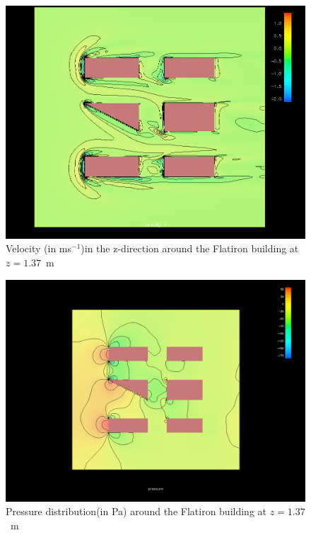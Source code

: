\begin{figure}[htp]
\centering
\includegraphics[width = \textwidth]{zvelocity.png}
\caption{Velocity (in ms$^{-1}$)in the z-direction around the Flatiron building at $z=1.37$~m}
\label{fig:zvelocity}
\end{figure}
\begin{figure}[htp]
\centering
\includegraphics[width = \textwidth]{zpressure.png}
\caption{Pressure distribution(in Pa) around the Flatiron building at $z=1.37$~m}
\label{fig:zpressure}
\end{figure}
